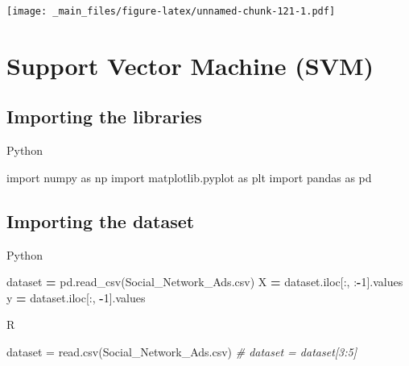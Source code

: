 \documentclass[
]{book}
\newenvironment{Shaded}{\begin{snugshade}}{\end{snugshade}}
\newcommand{\CommentTok}[1]{\textcolor[rgb]{0.56,0.35,0.01}{\textit{#1}}}
\newcommand{\DecValTok}[1]{\textcolor[rgb]{0.00,0.00,0.81}{#1}}
\newcommand{\FunctionTok}[1]{\textcolor[rgb]{0.00,0.00,0.00}{#1}}
\newcommand{\ImportTok}[1]{#1}
\newcommand{\NormalTok}[1]{#1}
\newcommand{\OperatorTok}[1]{\textcolor[rgb]{0.81,0.36,0.00}{\textbf{#1}}}
\newcommand{\OtherTok}[1]{\textcolor[rgb]{0.56,0.35,0.01}{#1}}
\newcommand{\StringTok}[1]{\textcolor[rgb]{0.31,0.60,0.02}{#1}}
\theoremstyle{definition}
\theoremstyle{definition}
\theoremstyle{definition}
\theoremstyle{definition}
\theoremstyle{remark}
\begin{document}
\texttt{[image: \_main\_files/figure-latex/unnamed-chunk-121-1.pdf]}

\hypertarget{support-vector-machine-svm}{%
\section{Support Vector Machine (SVM)}\label{support-vector-machine-svm}}

\hypertarget{importing-the-libraries-9}{%
\subsection{Importing the libraries}\label{importing-the-libraries-9}}

Python

\begin{Shaded}
\begin{Highlighting}[]
\ImportTok{import}\NormalTok{ numpy }\ImportTok{as}\NormalTok{ np}
\ImportTok{import}\NormalTok{ matplotlib.pyplot }\ImportTok{as}\NormalTok{ plt}
\ImportTok{import}\NormalTok{ pandas }\ImportTok{as}\NormalTok{ pd}
\end{Highlighting}
\end{Shaded}

\hypertarget{importing-the-dataset-9}{%
\subsection{Importing the dataset}\label{importing-the-dataset-9}}

Python

\begin{Shaded}
\begin{Highlighting}[]
\NormalTok{dataset }\OperatorTok{=}\NormalTok{ pd.read\_csv(}\StringTok{\textquotesingle{}Social\_Network\_Ads.csv\textquotesingle{}}\NormalTok{)}
\NormalTok{X }\OperatorTok{=}\NormalTok{ dataset.iloc[:, :}\OperatorTok{{-}}\DecValTok{1}\NormalTok{].values}
\NormalTok{y }\OperatorTok{=}\NormalTok{ dataset.iloc[:, }\OperatorTok{{-}}\DecValTok{1}\NormalTok{].values}
\end{Highlighting}
\end{Shaded}

R

\begin{Shaded}
\begin{Highlighting}[]
\NormalTok{dataset }\OtherTok{=} \FunctionTok{read.csv}\NormalTok{(}\StringTok{\textquotesingle{}Social\_Network\_Ads.csv\textquotesingle{}}\NormalTok{)}
\CommentTok{\# dataset = dataset[3:5]}
\end{Highlighting}
\end{Shaded}
\end{document}
